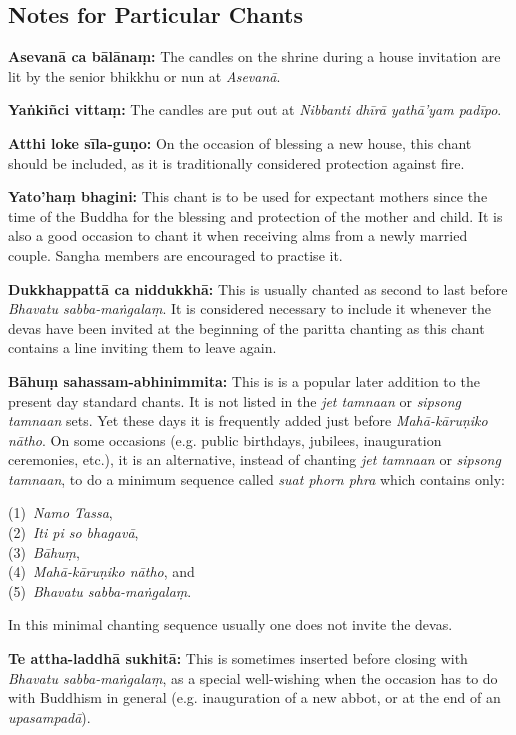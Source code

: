 \subsection*{Notes for Particular Chants}

\textbf{Asevanā ca bālānaṃ:} The candles on the shrine during a house invitation
are lit by the senior bhikkhu or nun at \emph{Asevanā}.

\textbf{Yaṅkiñci vittaṃ:} The candles are put out at \emph{Nibbanti
  dhīrā yathā'yam padīpo}.

\textbf{Atthi loke sīla-guṇo:} On the occasion of blessing a new house, this
chant should be included, as it is traditionally considered protection against
fire.

\textbf{Yato'haṃ bhagini:} This chant is to be used for expectant mothers since
the time of the Buddha for the blessing and protection of the mother and child.
It is also a good occasion to chant it when receiving alms from a newly married
couple. Sangha members are encouraged to practise it.

\textbf{Dukkhappattā ca niddukkhā:} This is usually chanted as second to last
before \emph{Bhavatu sabba-maṅgalaṃ}. It is considered necessary to include it
whenever the devas have been invited at the beginning of the paritta chanting
as this chant contains a line inviting them to leave again.

\textbf{Bāhuṃ sahassam-abhinimmita:} This is is a popular later addition to the
present day standard chants. It is not listed in the \emph{jet tamnaan} or
\emph{sipsong tamnaan} sets. Yet these days it is frequently added just before
\emph{Mahā-kāruṇiko nātho}. On some occasions (e.g. public birthdays, jubilees,
inauguration ceremonies, etc.), it is an alternative, instead of chanting
\emph{jet tamnaan} or \emph{sipsong tamnaan}, to do a minimum sequence called
\emph{suat phorn phra} which contains only:

(1)~\emph{Namo Tassa},\\
(2)~\emph{Iti pi so bhagavā},\\
(3)~\emph{Bāhuṃ},\\
(4)~\emph{Mahā-kāruṇiko nātho}, and\\
(5)~\emph{Bhavatu sabba-maṅgalaṃ}.

In this minimal chanting sequence usually one does not invite the devas.

\textbf{Te attha-laddhā sukhitā:} This is sometimes inserted before closing with
\emph{Bhavatu sabba-maṅgalaṃ}, as a special well-wishing when the occasion has
to do with Buddhism in general (e.g. inauguration of a new abbot, or at the end
of an \emph{upasampadā}).

